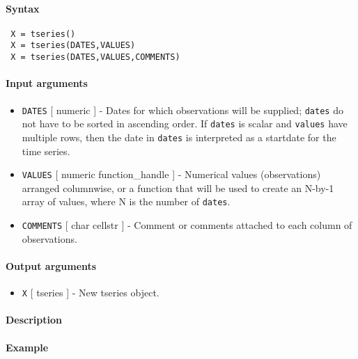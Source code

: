 


	\paragraph{Syntax}
 
 \begin{verbatim}
 X = tseries()
 X = tseries(DATES,VALUES)
 X = tseries(DATES,VALUES,COMMENTS)
 \end{verbatim}
 
 \paragraph{Input arguments}
 
 \begin{itemize}
 \item
   \texttt{DATES} {[} numeric {]} - Dates for which observations will be
   supplied; \texttt{dates} do not have to be sorted in ascending order.
   If \texttt{dates} is scalar and \texttt{values} have multiple rows,
   then the date in \texttt{dates} is interpreted as a startdate for the
   time series.
 \item
   \texttt{VALUES} {[} numeric \textbar{} function\_handle {]} -
   Numerical values (observations) arranged columnwise, or a function
   that will be used to create an N-by-1 array of values, where N is the
   number of \texttt{dates}.
 \item
   \texttt{COMMENTS} {[} char \textbar{} cellstr {]} - Comment or
   comments attached to each column of observations.
 \end{itemize}
 
 \paragraph{Output arguments}
 
 \begin{itemize}
 \item
   \texttt{X} {[} tseries {]} - New tseries object.
 \end{itemize}
 
 \paragraph{Description}
 
 \paragraph{Example}


